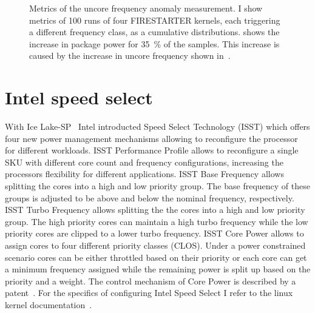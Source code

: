 \begin{figure}[t!]
{    }\hfill
    \caption{Metrics of the uncore frequency anomaly measurement.
    I show metrics of \SI{100}{} runs of four FIRESTARTER kernels, each triggering a different frequency class, as a cumulative distributions.
     shows the increase in package power for \SI{35}{\percent} of the samples.
    This increase is caused by the increase in uncore frequency shown in~.}
    \label{fig:avx-frequency-uncore-anomaly}
\end{figure}


\section{Intel speed select}
\label{sec:isst}
With Ice Lake-SP~\cite{Intel_2020_IceLake_SP} Intel introducted Speed Select Technology (ISST) which offers four new power management mechanisms allowing to reconfigure the processor for different workloads.
ISST Performance Profile allows to reconfigure a single SKU with different core count and frequency configurations, increasing the processors flexibility for different applications.
ISST Base Frequency allows splitting the cores into a high and low priority group.
The base frequency of these groups is adjusted to be above and below the nominal frequency, respectively.
ISST Turbo Frequency allows splitting the the cores into a high and low priority group.
The high priority cores can maintain a high turbo frequency while the low priority cores are clipped to a lower turbo frequency.
ISST Core Power allows to assign cores to four different priority classes (CLOS).
Under a power constrained scenario cores can be either throttled based on their priority or each core can get a minimum frequency assigned while the remaining power is split up based on the priority and a weight.
The control mechanism of Core Power is described by a patent~\cite[pages~87-111]{Intel_2021_HPM}.
For the specifics of configuring Intel Speed Select I refer to the linux kernel documentation~\cite{Kernel_IntelSpeedSelect}.

